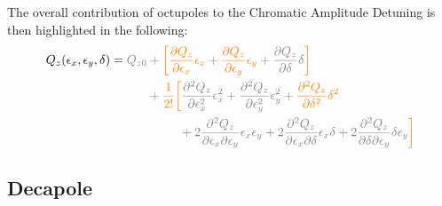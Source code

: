 The overall contribution of octupoles to the Chromatic Amplitude Detuning is then highlighted in
the following:
\begin{equation}
\begin{aligned}
Q_z(\epsilon_x, \epsilon_y, \delta) = \color{gray}Q_{z0} &\color{gray}+
                                                \textcolor{orange}{\biggl[}
                                                   \textcolor{orange}{\frac{\partial Q_z}{\partial \epsilon_x} \epsilon_x}
                                                 + \textcolor{orange}{\frac{\partial Q_z}{\partial \epsilon_y} \epsilon_y}
                                                 + \frac{\partial Q_z}{\partial \delta} \delta
                                                \textcolor{orange}{\biggr]} \\
                                             &\color{gray}
                                             + \textcolor{orange}{\frac{1}{2!} \biggl[}
                                                   \frac{\partial^2Q_z}{\partial \epsilon_x^2}\epsilon_x^2 
                                                 + \frac{\partial^2Q_z}{\partial \epsilon_y^2}\epsilon_y^2
                                                 + \textcolor{orange}{\frac{\partial^2 Q_z}{\partial \delta^2} \delta^2}  \\
                                             &\;\begin{aligned}
                                             \phantom{+ \frac{1}{2!} \biggl[}
                                               & \color{gray}
                                               + 2 \frac{\partial^2Q_z}{\partial \epsilon_x \partial \epsilon_y}\epsilon_x \epsilon_y
                                                  + 2 \frac{\partial^2Q_z}{\partial \epsilon_x \partial \delta}\epsilon_x \delta
                                                  + 2 \frac{\partial^2Q_z}{\partial \delta \partial \epsilon_y} \delta \epsilon_y
                                             \textcolor{orange}{\biggr]} \\
                                             \end{aligned} 
\end{aligned}
\end{equation}


\subsection{Decapole}\label{decapole-2}

